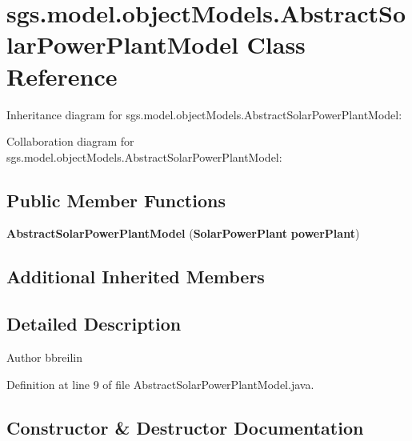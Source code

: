 \section{sgs.\-model.\-object\-Models.\-Abstract\-Solar\-Power\-Plant\-Model Class Reference}
\label{classsgs_1_1model_1_1object_models_1_1_abstract_solar_power_plant_model}


Inheritance diagram for sgs.\-model.\-object\-Models.\-Abstract\-Solar\-Power\-Plant\-Model\-:


Collaboration diagram for sgs.\-model.\-object\-Models.\-Abstract\-Solar\-Power\-Plant\-Model\-:
\subsection*{Public Member Functions}
\begin{DoxyCompactItemize}
\item 
{\bf Abstract\-Solar\-Power\-Plant\-Model} ({\bf Solar\-Power\-Plant} {\bf power\-Plant})
\end{DoxyCompactItemize}
\subsection*{Additional Inherited Members}


\subsection{Detailed Description}
\begin{DoxyAuthor}{Author}
bbreilin 
\end{DoxyAuthor}


Definition at line 9 of file Abstract\-Solar\-Power\-Plant\-Model.\-java.



\subsection{Constructor \& Destructor Documentation}
